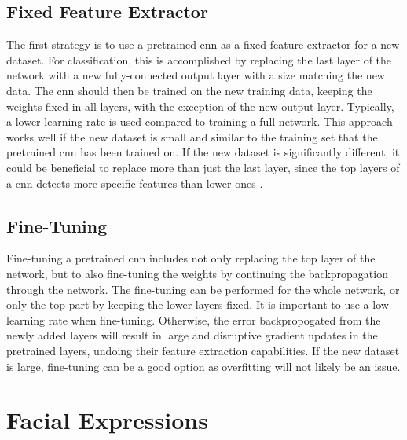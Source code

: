 \subsection{Fixed Feature Extractor}

The first strategy is to use a pretrained \acrshort{cnn} as a fixed feature extractor for a new dataset. For classification, this is accomplished by replacing the last layer of the network with a new fully-connected output layer with a size matching the new data. The \acrshort{cnn} should then be trained on the new training data, keeping the weights fixed in all layers, with the exception of the new output layer. Typically, a lower learning rate is used compared to training a full network. This approach works well if the new dataset is small and similar to the training set that the pretrained \acrshort{cnn} has been trained on. If the new dataset is significantly different, it could be beneficial to replace more than just the last layer, since the top layers of a \acrshort{cnn} detects more specific features than lower ones \cite{transfer-learning-cs231n}.

\subsection{Fine-Tuning}

Fine-tuning a pretrained \acrshort{cnn} includes not only replacing the top layer of the network, but to also fine-tuning the weights by continuing the backpropagation through the network. The fine-tuning can be performed for the whole network, or only the top part by keeping the lower layers fixed. It is important to use a low learning rate when fine-tuning. Otherwise, the error backpropogated from the newly added layers will result in large and disruptive gradient updates in the pretrained layers, undoing their feature extraction capabilities. If the new dataset is large, fine-tuning can be a good option as overfitting will not likely be an issue. 

\section{Facial Expressions} \label{sec:facial-expressions} %

